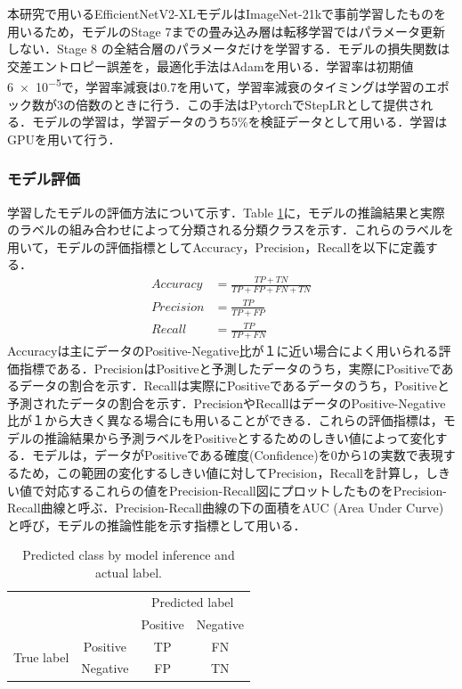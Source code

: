 本研究で用いるEfficientNetV2-XLモデルはImageNet-21k\cite{krizhevsky2012}で事前学習したものを用いるため，モデルのStage 7までの畳み込み層は転移学習ではパラメータ更新しない．Stage 8 の全結合層のパラメータだけを学習する．モデルの損失関数は交差エントロピー誤差\cite{bishop2006}を，最適化手法はAdam\cite{kingma2015}を用いる．学習率は初期値\num{6e-5}で，学習率減衰は\num{0.7}を用いて，学習率減衰のタイミングは学習のエポック数が\num{3}の倍数のときに行う．この手法はPytorchでStepLRとして提供される．モデルの学習は，学習データのうち\num{5}\%を検証データとして用いる．学習はGPUを用いて行う．

\subsubsection{モデル評価}
学習したモデルの評価方法について示す．Table \ref{table:evalclass}に，モデルの推論結果と実際のラベルの組み合わせによって分類される分類クラスを示す．これらのラベルを用いて，モデルの評価指標としてAccuracy，Precision，Recallを以下に定義する．
\begin{align}
    Accuracy &= \frac{TP + TN}{TP + FP + FN + TN} \\
    Precision &= \frac{TP}{TP + FP} \\
    Recall &= \frac{TP}{TP + FN}
\end{align}
Accuracyは主にデータのPositive-Negative比が１に近い場合によく用いられる評価指標である．PrecisionはPositiveと予測したデータのうち，実際にPositiveであるデータの割合を示す．Recallは実際にPositiveであるデータのうち，Positiveと予測されたデータの割合を示す．PrecisionやRecallはデータのPositive-Negative比が１から大きく異なる場合にも用いることができる．これらの評価指標は，モデルの推論結果から予測ラベルをPositiveとするためのしきい値によって変化する．モデルは，データがPositiveである確度(Confidence)を0から1の実数で表現するため，この範囲の変化するしきい値に対してPrecision，Recallを計算し，しきい値で対応するこれらの値をPrecision-Recall図にプロットしたものをPrecision-Recall曲線と呼ぶ．Precision-Recall曲線の下の面積をAUC (Area Under Curve)と呼び，モデルの推論性能を示す指標として用いる\cite{saito2015}．
\begin{table}[H]
    \centering
    \caption{Predicted class by model inference and actual label.}
    \begin{tabular}{c|c | cc}
        \multicolumn{2}{l|}{\multirow{2}{*}{}}  & \multicolumn{2}{c}{Predicted label} \\ \cline{3-4}
        \multicolumn{2}{l|}{}                   & Positive         & Negative         \\ \hline 
        \multirow{2}{*}{True label} & Positive & TP               & FN               \\ \cline{2-4}
                                    & Negative & FP               & TN              
        \end{tabular}
    \label{table:evalclass}
\end{table}


